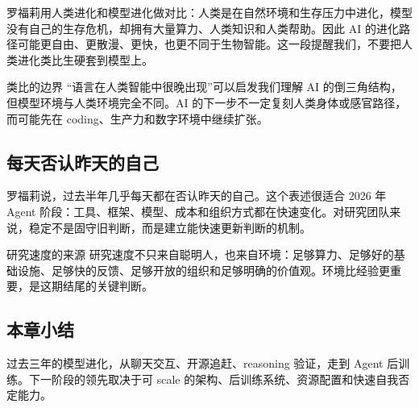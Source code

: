 罗福莉用人类进化和模型进化做对比：人类是在自然环境和生存压力中进化，模型没有自己的生存危机，却拥有大量算力、人类知识和人类帮助。因此 AI 的进化路径可能更自由、更散漫、更快，也更不同于生物智能。这一段提醒我们，不要把人类进化类比生硬套到模型上。

\begin{knowledgebox}{类比的边界}
“语言在人类智能中很晚出现”可以启发我们理解 AI 的倒三角结构，但模型环境与人类环境完全不同。AI 的下一步不一定复刻人类身体或感官路径，而可能先在 coding、生产力和数字环境中继续扩张。
\end{knowledgebox}

\subsection{每天否认昨天的自己}

罗福莉说，过去半年几乎每天都在否认昨天的自己。这个表述很适合 2026 年 Agent 阶段：工具、框架、模型、成本和组织方式都在快速变化。对研究团队来说，稳定不是固守旧判断，而是建立能快速更新判断的机制。

\begin{importantbox}{研究速度的来源}
研究速度不只来自聪明人，也来自环境：足够算力、足够好的基础设施、足够快的反馈、足够开放的组织和足够明确的价值观。环境比经验更重要，是这期结尾的关键判断。
\end{importantbox}

\subsection{本章小结}

过去三年的模型进化，从聊天交互、开源追赶、reasoning 验证，走到 Agent 后训练。下一阶段的领先取决于可 scale 的架构、后训练系统、资源配置和快速自我否定能力。

